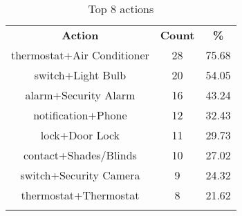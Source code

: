 \begin{table}[t]
\centering
\scriptsize
\caption{{\small Top 8 actions}}
\label{tbl:top-8-action}
\begin{tabular}{c|c|c}
\Xhline{2\arrayrulewidth}
{\bf Action}& {\bf Count}&{\bf \%}\\
\Xhline{2\arrayrulewidth}
thermostat+Air Conditioner & 28 & 75.68\\
switch+Light Bulb & 20 & 54.05\\
alarm+Security Alarm & 16 & 43.24\\
notification+Phone & 12 & 32.43\\
lock+Door Lock & 11 & 29.73\\
contact+Shades/Blinds & 10 & 27.02\\
switch+Security Camera & 9 & 24.32\\
thermostat+Thermostat & 8 & 21.62\\
\Xhline{2\arrayrulewidth}
\Xhline{2\arrayrulewidth}
\end{tabular}
\end{table}
